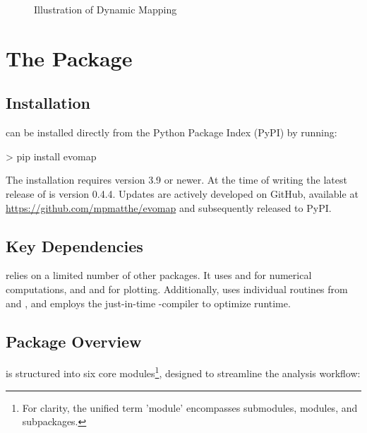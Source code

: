 \documentclass[article]{jss}
\begin{document}
\begin{figure}
  \centering
  \caption{\label{fig:dynamic-map-illustration} Illustration of Dynamic Mapping}
\end{figure}

\section[The evomap Package]{The  Package} \label{sec:package}

\subsection{Installation}

 can be installed directly from the Python Package Index (PyPI) by running:

\begin{CodeChunk}
  \begin{CodeInput}
  > pip install evomap
  \end{CodeInput}
\end{CodeChunk}

The installation requires  version 3.9 or newer. 
At the time of writing the latest release of  is version 0.4.4. Updates are actively developed on GitHub, 
available at \href{https://github.com/mpmatthe/evomap}{https://github.com/mpmatthe/evomap} and subsequently released to PyPI.

\subsection{Key Dependencies}

 relies on a limited number of other packages. It uses  and  for numerical 
computations, and  and  for plotting. Additionally,  uses individual 
routines from  and , and employs the just-in-time -compiler  
to optimize runtime.

\subsection{Package Overview}

 is structured into six core modules\footnote{For clarity, the unified term 'module' encompasses 
submodules, modules, and subpackages.}, designed to streamline the analysis workflow:
\end{document}
